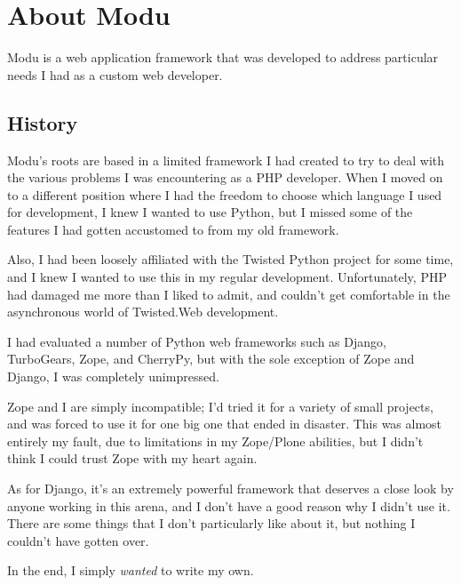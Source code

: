 \chapter{About Modu}

Modu is a web application framework that was developed to address particular
needs I had as a custom web developer.

\section{History}

Modu's roots are based in a limited framework I had created to try to deal
with the various problems I was encountering as a PHP developer. When I
moved on to a different position where I had the freedom to choose which
language I used for development, I knew I wanted to use Python, but I missed
some of the features I had gotten accustomed to from my old framework.

Also, I had been loosely affiliated with the Twisted Python project for some
time, and I knew I wanted to use this in my regular development. Unfortunately,
PHP had damaged me more than I liked to admit, and couldn't get comfortable
in the asynchronous world of Twisted.Web development.

I had evaluated a number of Python web frameworks such as Django, TurboGears,
Zope, and CherryPy, but with the sole exception of Zope and Django, I was
completely unimpressed.

Zope and I are simply incompatible; I'd tried it for a variety of small
projects, and was forced to use it for one big one that ended in disaster. This
was almost entirely my fault, due to limitations in my Zope/Plone abilities,
but I didn't think I could trust Zope with my heart again.

As for Django, it's an extremely powerful framework that deserves a close look
by anyone working in this arena, and I don't have a good reason why I didn't
use it. There are some things that I don't particularly like about it, but
nothing I couldn't have gotten over.

In the end, I simply \emph{wanted} to write my own.
